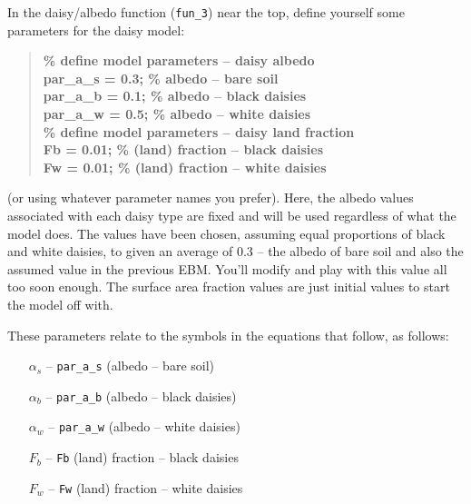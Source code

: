 \documentclass{tufte-book} %
\newenvironment{docspecbold}{\begin{quotation}\ttfamily\bfseries\parskip0pt\parindent0pt\ignorespaces}{\end{quotation}}
\begin{document}
In the daisy/albedo function (\texttt{fun\_3})  near the top, define yourself some parameters for the daisy model:
\begin{docspecbold}
\% define model parameters -- daisy albedo
\\par\_a\_s = 0.3; \% albedo -- bare soil
\\par\_a\_b = 0.1; \% albedo -- black daisies
\\par\_a\_w = 0.5; \% albedo -- white daisies
\\\% define model parameters -- daisy land fraction
\\Fb = 0.01; \% (land) fraction -- black daisies
\\Fw = 0.01; \% (land) fraction -- white daisies
\end{docspecbold}
(or using whatever parameter names you prefer). Here, the albedo values associated with each daisy type are fixed and will be used regardless of what the model does. The values have been chosen, assuming equal proportions of black and white daisies, to given an average of 0.3 -- the albedo of bare soil and also the assumed value in the previous EBM. You'll modify and play with this value all too soon enough. The surface area fraction values are just initial values to start the model off with.

These parameters relate to the symbols in the equations that follow, as follows:

\begin{itemize}[noitemsep]
\setlength{\itemindent}{.2in}
\item[\(\alpha_{s}\)] -- \texttt{par\_a\_s} (albedo -- bare soil)
\item[\(\alpha_{b}\)] -- \texttt{par\_a\_b} (albedo -- black daisies)
\item[\(\alpha_{w}\)] -- \texttt{par\_a\_w} (albedo -- white daisies)
\item[\(F_{b}\)] -- \texttt{Fb} (land) fraction -- black daisies
\item[\(F_{w}\)] -- \texttt{Fw} (land) fraction -- white daisies
\end{itemize}
\vspace{0mm}
\end{document}
